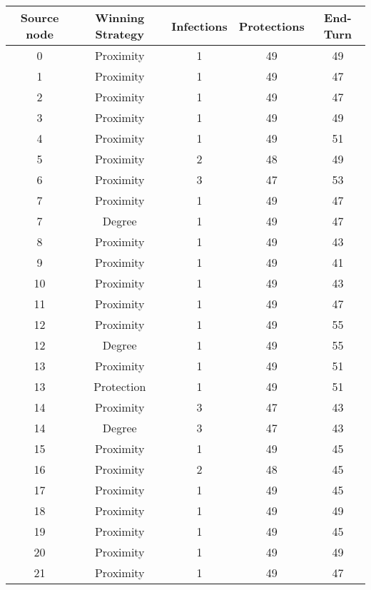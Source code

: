 \documentclass[results.tex]{subfiles}
\begin{document}
\begin{center}
  \begin{tabular}{| c || c | c | c | c |}
    \hline
    {\bfseries Source node} & {\bfseries Winning Strategy} & {\bfseries Infections} & {\bfseries Protections} & {\bfseries End-Turn} \\  %
    \hline\hline
    0 & Proximity & 1 & 49 & 49 \\ 
    \hline
    1 & Proximity & 1 & 49 & 47 \\ 
    \hline
    2 & Proximity & 1 & 49 & 47 \\ 
    \hline
    3 & Proximity & 1 & 49 & 49 \\ 
    \hline
    4 & Proximity & 1 & 49 & 51 \\ 
    \hline
    5 & Proximity & 2 & 48 & 49 \\ 
    \hline
    6 & Proximity & 3 & 47 & 53 \\ 
    \hline
    7 & Proximity & 1 & 49 & 47 \\ 
    \hline
    7 & Degree & 1 & 49 & 47 \\ 
    \hline
    8 & Proximity & 1 & 49 & 43 \\ 
    \hline
    9 & Proximity & 1 & 49 & 41 \\ 
    \hline
    10 & Proximity & 1 & 49 & 43 \\ 
    \hline
    11 & Proximity & 1 & 49 & 47 \\ 
    \hline
    12 & Proximity & 1 & 49 & 55 \\ 
    \hline
    12 & Degree & 1 & 49 & 55 \\ 
    \hline
    13 & Proximity & 1 & 49 & 51 \\ 
    \hline
    13 & Protection & 1 & 49 & 51 \\ 
    \hline
    14 & Proximity & 3 & 47 & 43 \\ 
    \hline
    14 & Degree & 3 & 47 & 43 \\ 
    \hline
    15 & Proximity & 1 & 49 & 45 \\ 
    \hline
    16 & Proximity & 2 & 48 & 45 \\ 
    \hline
    17 & Proximity & 1 & 49 & 45 \\ 
    \hline
    18 & Proximity & 1 & 49 & 49 \\ 
    \hline
    19 & Proximity & 1 & 49 & 45 \\ 
    \hline
    20 & Proximity & 1 & 49 & 49 \\ 
    \hline
    21 & Proximity & 1 & 49 & 47 \\ 

\end{tabular}
\end{center}
\end{document}
